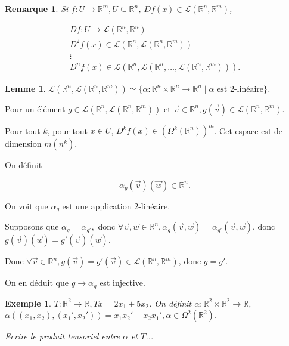 \documentclass[french]{article}
\newtheorem*{remark}{Remarque}
\newtheorem*{lemma}{Lemme}
\newtheorem{exemple}{Exemple}
\begin{document}
\begin{remark}
  Si $f : U \to \mathbb{R}^m, U \subseteq \mathbb{R}^n$, $Df(x) \in \mathscr{L}(\mathbb{R}^n, \mathbb{R}^m) $,

  \begin{gather*}
    Df:U \to \mathscr{L}(\mathbb{R}^n, \mathbb{R}^n) \\
    D ^2 f(x) \in \mathscr{L}(\mathbb{R}^n, \mathscr{L}(\mathbb{R}^n, \mathbb{R}^m) ) \\
    \vdots \\
    D ^{n}f(x) \in \mathscr{L}(\mathbb{R}^n, \mathscr{L}(\mathbb{R}^n, \dots, \mathscr{L}(\mathbb{R}^n, \mathbb{R}^m) ) ) .
  \end{gather*}
\end{remark}

\begin{lemma}
  $\mathscr{L}(\mathbb{R}^n, \mathscr{L}(\mathbb{R}^n, \mathbb{R}^m) ) \simeq \{ \alpha : \mathbb{R}^n \times \mathbb{R}^n \to \mathbb{R}^n \mid \alpha \text{ est 2-linéaire} \}  $.
\end{lemma}

Pour un élément $g \in \mathscr{L}(\mathbb{R}^n, \mathscr{L}(\mathbb{R}^n, \mathbb{R}^m) ) $ et $\overrightarrow{ v } \in \mathbb{R}^n, g(\overrightarrow{ v } ) \in \mathscr{L}(\mathbb{R}^n, \mathbb{R}^m) $.

Pour tout $k$, pour tout $x \in U$, $D ^{k}f(x) \in (\Omega ^{k}(\mathbb{R}^n))^{m}$. Cet espace est de dimension $m(n ^{k})$.

On définit

\[
\alpha_g(\overrightarrow{ v } )(\overrightarrow{ w } ) \in \mathbb{R}^n.
\]

On voit que $\alpha _{g}$ est une application 2-linéaire.

Supposons que $\alpha_g = \alpha _{g'}, $ donc $ \forall \overrightarrow{ v }, \overrightarrow{ w } \in \mathbb{R}^n, \alpha _{g}(\overrightarrow{ v }, \overrightarrow{ w }) = \alpha _{g'}(\overrightarrow{ v }, \overrightarrow{ w }) $, donc $g(\overrightarrow{ v } )(\overrightarrow{ w } ) = g'(\overrightarrow{ v } )(\overrightarrow{ w } )$.

Donc $\forall \overrightarrow{ v } \in \mathbb{R}^n, g(\overrightarrow{ v } ) = g'(\overrightarrow{ v } ) \in \mathscr{L}(\mathbb{R}^n, \mathbb{R}^m)$, donc $g = g'$.

On en déduit que $g \longrightarrow \alpha_g$ est injective.


\begin{exemple}
  \(T : \mathbb{R}^2 \to \mathbb{R}, Tx =  2x_1+ 5x_2 \). On définit \(\alpha : \mathbb{R}^2 \times \mathbb{R}^2 \to \mathbb{R}\), \(\alpha((x_1, x_2), (x_1', x_2')) = x_1 x_2'-x_2 x_1', \alpha \in \Omega ^2(\mathbb{R}^2)\).

  Ecrire le produit tensoriel entre \(\alpha\) et \(T\)...
\end{exemple}
\end{document}
